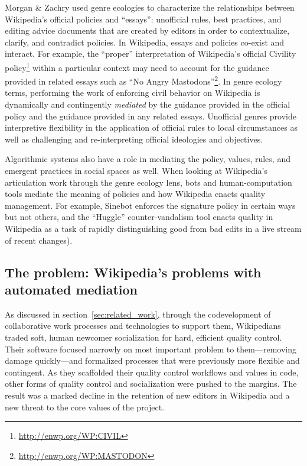 Morgan \& Zachry used genre ecologies to characterize the relationships between Wikipedia's official policies and ``essays'': unofficial rules, best practices, and editing advice documents that are created by editors in order to contextualize, clarify, and contradict policies\cite{morgan2010negotiating}. In Wikipedia, essays and policies co-exist and interact. For example, the ``proper'' interpretation of Wikipedia's official Civility policy\footnote{\url{http://enwp.org/WP:CIVIL}} within a particular context may need to account for the guidance provided in related essays such as ``No Angry Mastodons''\footnote{\url{http://enwp.org/WP:MASTODON}}. In genre ecology terms, performing the work of enforcing civil behavior on Wikipedia is dynamically and contingently \emph{mediated} by the guidance provided in the official policy and the guidance provided in any related essays. Unofficial genres provide interpretive flexibility in the application of official rules to local circumstances as well as challenging and re-interpreting official ideologies and objectives.

Algorithmic systems also have a role in mediating the policy, values, rules, and emergent practices in social spaces as well\cite{lessig1999code,suchman2007human,orlikowski2015algorithm}.  When looking at Wikipedia's articulation work through the genre ecology lens, bots and human-computation tools mediate the meaning of policies and how Wikipedia enacts quality management. For example, Sinebot enforces the signature policy in certain ways but not others\cite{geiger2011lives}, and the ``Huggle'' counter-vandalism tool enacts quality in Wikipedia as a task of rapidly distinguishing good from bad edits in a live stream of recent changes\cite{halfaker2014snuggle}).

\subsection{The problem: Wikipedia's problems with automated mediation}
As discussed in section~\ref{sec:related_work}, through the codevelopment of collaborative work processes and technologies to support them, Wikipedians traded soft, human newcomer socialization for hard, efficient quality control. Their software focused narrowly on most important problem to them---removing damage quickly---and formalized processes that were previously more flexible and contingent. As they scaffolded their quality control workflows and values in code, other forms of quality control and socialization were pushed to the margins.  The result was a marked decline in the retention of new editors in Wikipedia and a new threat to the core values of the project.

